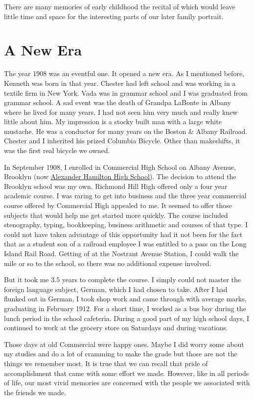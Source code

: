 \documentclass[12pt]{book}              %
\begin{document}
There are many memories of early childhood the recital of which would leave little time and space for the interesting parts of our later family portrait.

\chapter{A New Era}

The year 1908 was an eventful one. It opened a new era. As I mentioned before, Kenneth was born in that year. Chester had left school and was working in a textile firm in New York. Vada was in grammar school and I was graduated from grammar school. A sad event was the death of Grandpa LaBonte in Albany where he lived for many years. I had not seen him very much and really knew little about him. My impression is a stocky built man with a large white mustache. He was a conductor for many years on the Boston \& Albany Railroad. Chester and I inherited his prized Columbia Bicycle. Other than makeshifts, it was the first real bicycle we owned. 

In September 1908, I enrolled in Commercial High School on Albany Avenue, Brooklyn (now \href{http://www.brooklynvisualheritage.org/alexander-hamilton-high-school}{Alexander Hamilton High School}). The decision to attend the Brooklyn school was my own. Richmond Hill High offered only a four year academic course. I was raring to get into business and the three year commercial course offered by Commercial High appealed to me. It seemed to offer those subjects that would help me get started more quickly. The course included stenography, typing, bookkeeping, business arithmetic and courses of that type. I could not have taken advantage of this opportunity had it not been for the fact that as a student son of a railroad employee I was entitled to a pass on the Long Island Rail Road. Getting of at the Nostrant Avenue Station, I could walk the mile or so to the school, so there was no additional expense involved. 

But it took me 3.5 years to complete the course. I simply could not master the foreign language subject, German, which I had chosen to take. After I had flunked out in German, I took shop work and came through with average marks, graduating in February 1912. For a short time, I worked as a bus boy during the lunch period in the school cafeteria. During a good part of my high school days, I continued to work at the grocery store on Saturdays and during vacations. 

Those days at old Commercial were happy ones. Maybe I did worry some about my studies and do a lot of cramming to make the grade but those are not the things we remember most. It is true that we can recall that pride of accomplishment that came with some effort we made. However, like in all periods of life, our most vivid memories are concerned with the people we associated with the friends we made. 
\end{document}
